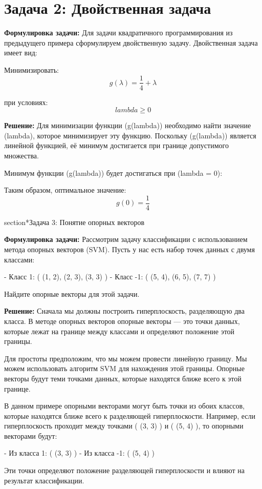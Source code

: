 \section{Задача 2: Двойственная задача}

\textbf{Формулировка задачи:} Для задачи квадратичного программирования из предыдущего примера сформулируем двойственную задачу. Двойственная задача имеет вид:

Минимизировать:
\[
    g(\lambda) = \frac{1}{4} + \lambda
\]

при условиях:
\[
    lambda \geq 0
\]

\textbf{Решение:} Для минимизации функции (g(lambda)) необходимо найти значение (lambda), которое минимизирует эту функцию. Поскольку (g(lambda)) является линейной функцией, её минимум достигается при границе допустимого множества.

Минимум функции (g(lambda)) будет достигаться при (lambda = 0):

Таким образом, оптимальное значение:
\[
    g(0) = \frac{1}{4}
\]

section*{Задача 3: Понятие опорных векторов}

\textbf{Формулировка задачи:} Рассмотрим задачу классификации с использованием метода опорных векторов (SVM). Пусть у нас есть набор точек данных с двумя классами:

- Класс 1: ( (1, 2), (2, 3), (3, 3) )
- Класс -1: ( (5, 4), (6, 5), (7, 7) )

Найдите опорные векторы для этой задачи.

\textbf{Решение:} Сначала мы должны построить гиперплоскость, разделяющую два класса. В методе опорных векторов опорные векторы — это точки данных, которые лежат на границе между классами и определяют положение этой границы.

Для простоты предположим, что мы можем провести линейную границу. Мы можем использовать алгоритм SVM для нахождения этой границы. Опорные векторы будут теми точками данных, которые находятся ближе всего к этой границе.

В данном примере опорными векторами могут быть точки из обоих классов, которые находятся ближе всего к разделяющей гиперплоскости. Например, если гиперплоскость проходит между точками ( (3, 3) ) и ( (5, 4) ), то опорными векторами будут:

- Из класса 1: ( (3, 3) )
- Из класса -1: ( (5, 4) )

Эти точки определяют положение разделяющей гиперплоскости и влияют на результат классификации.
